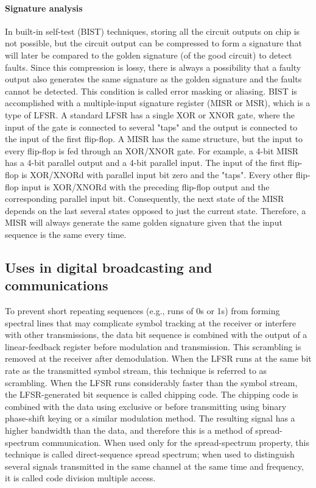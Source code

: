 \documentclass[11pt,a4paper,oneside, openright]{article}
\begin{document}
\paragraph{Signature analysis}
In built-in self-test (BIST) techniques, storing all the circuit outputs on chip is not possible, but the circuit output can be compressed to form a signature that will later be compared to the golden signature (of the good circuit) to detect faults. Since this compression is lossy, there is always a possibility that a faulty output also generates the same signature as the golden signature and the faults cannot be detected. This condition is called error masking or aliasing. BIST is accomplished with a multiple-input signature register (MISR or MSR), which is a type of LFSR. A standard LFSR has a single XOR or XNOR gate, where the input of the gate is connected to several "taps" and the output is connected to the input of the first flip-flop. A MISR has the same structure, but the input to every flip-flop is fed through an XOR/XNOR gate. For example, a 4-bit MISR has a 4-bit parallel output and a 4-bit parallel input. The input of the first flip-flop is XOR/XNORd with parallel input bit zero and the "taps". Every other flip-flop input is XOR/XNORd with the preceding flip-flop output and the corresponding parallel input bit. Consequently, the next state of the MISR depends on the last several states opposed to just the current state. Therefore, a MISR will always generate the same golden signature given that the input sequence is the same every time.

\subsection{Uses in digital broadcasting and communications}
To prevent short repeating sequences (e.g., runs of 0s or 1s) from forming spectral lines that may complicate symbol tracking at the receiver or interfere with other transmissions, the data bit sequence is combined with the output of a linear-feedback register before modulation and transmission. This scrambling is removed at the receiver after demodulation. When the LFSR runs at the same bit rate as the transmitted symbol stream, this technique is referred to as scrambling. When the LFSR runs considerably faster than the symbol stream, the LFSR-generated bit sequence is called chipping code. The chipping code is combined with the data using exclusive or before transmitting using binary phase-shift keying or a similar modulation method. The resulting signal has a higher bandwidth than the data, and therefore this is a method of spread-spectrum communication. When used only for the spread-spectrum property, this technique is called direct-sequence spread spectrum; when used to distinguish several signals transmitted in the same channel at the same time and frequency, it is called code division multiple access.
\end{document}
